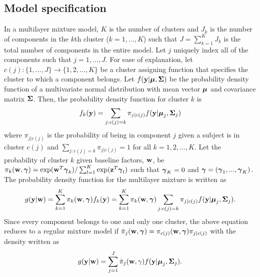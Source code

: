 \subsection{Model specification}
In a multilayer mixture model, $K$ is the number of clusters and $J_{k}$ is the number of components in the $k$th cluster ($k=1,...,K$) such that $J=\sum_{k=1}^{K}J_{k}$ is the total number of components in the entire model. Let $j$ uniquely index all of the components such that $j=1,...,J$. For ease of explanation, let $c(j):\{1,...,J\}\rightarrow \{1,2,...,K\}$ be a cluster assigning function that specifies the cluster to which a component belongs. Let $f(\mathbf y|\boldsymbol\mu,\boldsymbol\Sigma)$ be the probability density function of a multivariate normal distribution with mean vector $\boldsymbol\mu$ and covariance matrix $\boldsymbol\Sigma$. Then, the probability density function for cluster $k$ is
$$f_{k}(\mathbf y) = \sum_{j: c(j) = k} \pi_{j|c(j)}f(\mathbf y|\boldsymbol\mu_{j},\boldsymbol \Sigma_{j})$$
where $\pi_{j|c(j)}$ is the probability of being in component $j$ given a subject is in cluster $c(j)$ and $\sum_{j: c(j) = k}\pi_{j|c(j)}=1$ for all $k=1,2,...,K$. Let the probability of cluster $k$ given baseline factors, $\mathbf w$, be $\pi_{k}(\mathbf w,\boldsymbol\gamma)=\exp(\mathbf w^{T}\boldsymbol\gamma_{k})/\sum^{K}_{l=1}\exp(\mathbf z^{T}\boldsymbol\gamma_{l})$ such that $\boldsymbol\gamma_{K}=0$ and $\boldsymbol\gamma=(\boldsymbol\gamma_{1},...,\boldsymbol\gamma_{K})$. The probability density function for the multilayer mixture is written as
$$g(\mathbf y|\mathbf w) = \sum_{k=1}^{K}\pi_{k}(\mathbf w,\boldsymbol \gamma)f_{k}(\mathbf y) = \sum_{k=1}^{K}\pi_{k}(\mathbf w,\boldsymbol\gamma)\sum_{j: c(j) = k} \pi_{j|c(j)}f( \mathbf y| \boldsymbol\mu_{j},\boldsymbol\Sigma_{j}).$$
Since every component belongs to one and only one cluster, the above equation reduces to a regular mixture model if $\bar{\pi}_{j}(\mathbf w,\boldsymbol \gamma)=\pi_{c(j)}(\mathbf w,\boldsymbol\gamma)\pi_{j|c(j)}$ with the density written as
$$g(\mathbf y|\mathbf w) = \sum_{j=1}^{J}\bar{\pi}_{j}(\mathbf w,\gamma)f(\mathbf y|\boldsymbol \mu_{j},\boldsymbol\Sigma_{j}).$$

